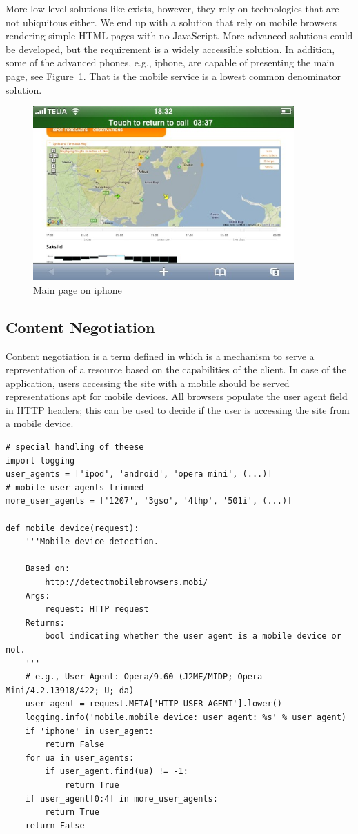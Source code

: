 More low level solutions like \citep{sun:lbs} exists, however, they rely on
technologies that are not ubiquitous either. We end up with a solution that rely
on mobile browsers rendering simple HTML pages with no JavaScript. More advanced
solutions could be developed, but the requirement is a widely accessible
solution. In addition, some of the advanced phones, e.g., iphone, are capable of
presenting the main page, see Figure~\ref{fig:iphone}. That is the mobile service
is a lowest common denominator solution.

\begin{figure}[htbp]
  \centering
  \includegraphics[width=10cm]{./Figures/iphone}
  \caption{Main page on iphone}
  \label{fig:iphone}
\end{figure}

\subsection{Content Negotiation}
Content negotiation is a term defined in \citep[sec.12]{w3:HTTP} which is a
mechanism to serve a representation of a resource based on the capabilities of
the client. In case of the application, users accessing the site with a mobile
should be served representations apt for mobile devices. All browsers populate
the user agent field in HTTP headers; this can be used to decide if the user is
accessing the site from a mobile device.

\begin{lstlisting}[caption=Mobile user agent detection, label=lst:mob_detection]
# special handling of theese
import logging
user_agents = ['ipod', 'android', 'opera mini', (...)]
# mobile user agents trimmed
more_user_agents = ['1207', '3gso', '4thp', '501i', (...)]

def mobile_device(request):
    '''Mobile device detection.
    
    Based on: 
        http://detectmobilebrowsers.mobi/
    Args:
        request: HTTP request
    Returns:
        bool indicating whether the user agent is a mobile device or not.
    '''
    # e.g., User-Agent: Opera/9.60 (J2ME/MIDP; Opera Mini/4.2.13918/422; U; da)
    user_agent = request.META['HTTP_USER_AGENT'].lower()
    logging.info('mobile.mobile_device: user_agent: %s' % user_agent)
    if 'iphone' in user_agent:
        return False
    for ua in user_agents:
        if user_agent.find(ua) != -1:
            return True
    if user_agent[0:4] in more_user_agents:
        return True
    return False
\end{lstlisting}

